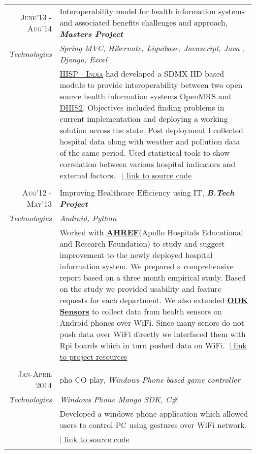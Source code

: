 \documentclass[a4paper,10pt]{article} %
\begin{document}
\begin{longtable}{r|p{13cm}}

\textsc{June'13 - Aug'14} & Interoperability model for health information systems and associated benefits challenges and approach, \emph\textbf{Masters Project}\\
\emph{Technologies} & \emph{Spring MVC, Hibernate, Liquibase, Javascript, Java , Django, Excel}\\ 
& \small{\href{http://hispindia.org/}{\textsc{HISP - India}} had developed a SDMX-HD based module to provide interoperability between two open source health information systems \href{http://openmrs.org/}{OpenMRS} and \href{https://www.dhis2.org/}{DHIS2}. Objectives included finding problems in current implementation and deploying a working solution across the state. Post deployment I collected hospital data along with weather and pollution data of the same period. Used statistical tools to show correlation between various hospital indicators and external factors.} \ \href{https://github.com/hispindia/dhisreport}{\hfill | link to source code}\\
\multicolumn{2}{c}{} \\


\textsc{Aug'12 - May'13} & Improving Healthcare Efficiency using IT, \emph\textbf{B.Tech Project}\\
\emph{Technologies} & \emph{Android, Python}\\ 
& \small{Worked with \href{http://www.aherf.org/}{\textbf{AHREF}}(Apollo Hospitals Educational and Research Foundation) to study and
suggest improvement to the newly deployed hospital information system.  We prepared a
comprehensive report based on a three month empirical study. Based on the study we
provided usability and feature requests for each department. We also extended \href{https://opendatakit.org/use/sensors/}{\textbf{ODK Sensors}} to collect data from health sensors on Android phones over WiFi.  Since many senors do not push
data over WiFi directly we interfaced them with Rpi boards which in turn pushed data on
WiFi.}\ \href{https://sites.google.com/a/iiitd.ac.in/apurvmehra/projects}{\hfill | link to project resources}\\
\multicolumn{2}{c}{} \\


\textsc{Jan-April 2014} & pho-CO-play, \emph{Windows Phone based game controller}\\
\emph{Technologies} & \emph{Windows Phone Mango SDK, C\# }\\ 
& \small{Developed a windows phone application which allowed users to control PC using gestures over WiFi network. }\\ & \href{https://github.com/am2990/pho-CO-play}{\hfill | link to source code}\\
\multicolumn{2}{c}{} \\


\end{longtable}
\end{document}
